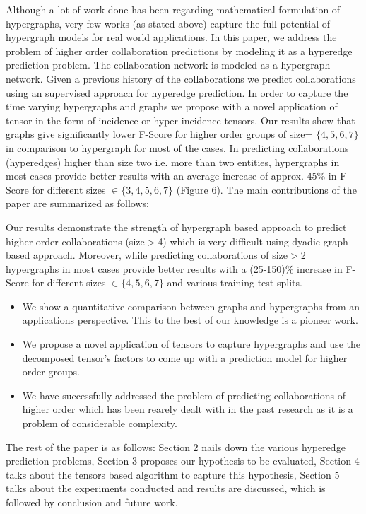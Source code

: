 \documentclass[twoside,leqno,twocolumn]{article}
\begin{document}

Although a lot of work done has been regarding mathematical formulation of hypergraphs, very few works (as stated above) capture the full potential of hypergraph models for real world applications. In this paper, we address the problem of higher order collaboration predictions by modeling it as a hyperedge prediction problem. The collaboration network is modeled as a hypergraph network. Given a previous history of the collaborations we predict collaborations using an supervised approach for hyperedge prediction. In order to capture the time varying hypergraphs and graphs we propose with a novel application of tensor in the form of incidence or hyper-incidence tensors. Our results show that graphs give significantly lower F-Score for higher order groups of size= $\{4,5,6,7\}$ in comparison to hypergraph for most of the cases. In predicting collaborations (hyperedges) higher than size two i.e. more than two entities, hypergraphs in most cases provide better results with an average increase of approx. 45\% in F-Score for different sizes $\in \{3,4,5,6,7\}$ (Figure 6). The main contributions of the paper are summarized as follows:

Our results demonstrate the strength of hypergraph based approach to predict higher order collaborations (size$>$4) which is very difficult using dyadic graph based approach. Moreover, while predicting collaborations of size$>$2 hypergraphs in most cases provide better results with a (25-150)\% increase in F-Score for different sizes $\in \{4,5,6,7\}$  and various training-test splits. 

\begin{itemize}
\item We show a quantitative comparison between graphs and hypergraphs from an applications perspective. This to the best of our knowledge is a pioneer work.
\item We propose a novel application of tensors to capture hypergraphs and use the decomposed tensor's factors to come up with a prediction model for higher order groups.

\item We have successfully addressed the problem of predicting collaborations of higher order which has been rearely dealt with in the past research as it is a problem of considerable complexity.
\end{itemize} 

The rest of the paper is as follows: Section 2 nails down the various hyperedge prediction problems, Section 3 proposes our hypothesis to be evaluated, Section 4 talks about the tensors based algorithm to capture this hypothesis, Section 5 talks about the experiments conducted and results are discussed, which is followed by conclusion and future work.
\end{document}
